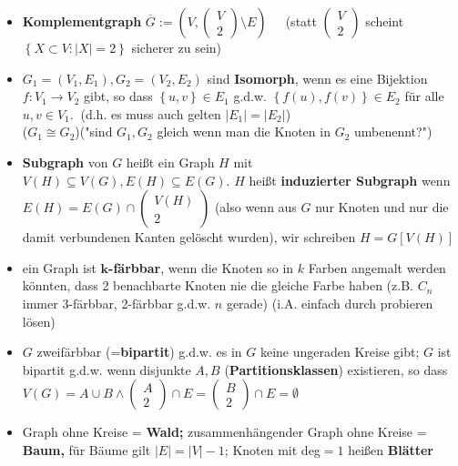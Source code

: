 \documentclass[10pt,a4paper]{article}
\begin{document}
\begin{itemize}
\item \textbf{Komplementgraph} $\overline{G}:=\left(V,\begin{pmatrix}
V\\2
\end{pmatrix}\setminus E \right)\;\;\;\;$  (statt $\begin{pmatrix} V\\2 \end{pmatrix}$ scheint $\left\lbrace X \subset V : \vert X \vert=2\right\rbrace$ sicherer zu sein)
\item $G_{1}=(V_{1},E_{1}), G_{2}=(V_{2},E_{2})$ sind \textbf{Isomorph}, wenn es eine Bijektion $f:V_{1}\rightarrow V_{2}$ gibt, so dass $\left\lbrace u,v\right\rbrace \in E_{1}$ g.d.w. $\left\lbrace f(u),f(v)\right\rbrace \in E_{2}$ für alle $u,v\in V_{1}.\;\;$(d.h. es muss auch gelten $\vert E_{1}\vert=\vert E_{2}\vert$)\\  ($G_{1}\cong G_{2}$)("sind $G_{1},G_{2}$ gleich wenn man die Knoten in $G_{2}$ umbenennt?")
\item \textbf{Subgraph} von $G$ heißt ein Graph $H$ mit $V(H)\subseteq V(G),E(H)\subseteq E(G)$. $H$ heißt \textbf{induzierter Subgraph} wenn $E(H)=E(G)\cap \begin{pmatrix} V(H)\\2\end{pmatrix}$ (also wenn aus $G$ nur Knoten und nur die damit verbundenen Kanten gelöscht wurden), wir schreiben $H=G[V(H)]$
\item ein Graph ist \textbf{$\boldsymbol{k}$-färbbar}, wenn die Knoten so in $k$ Farben angemalt werden könnten, dass 2 benachbarte Knoten nie die gleiche Farbe haben (z.B. $C_{n}$ immer 3-färbbar, 2-färbbar g.d.w. $n$ gerade) (i.A. einfach durch probieren lösen)
\item $G$ zweifärbbar (=\textbf{bipartit}) g.d.w. es in $G$ keine ungeraden Kreise gibt; $G$ ist bipartit g.d.w. wenn disjunkte $A,B$ (\textbf{Partitionsklassen}) existieren, so dass $V(G)=A\cup B\land \begin{pmatrix} A\\2\end{pmatrix}\cap E= \begin{pmatrix} B\\2\end{pmatrix}\cap E =\emptyset$
\item Graph ohne Kreise = \textbf{Wald;} zusammenhängender Graph ohne Kreise = \textbf{Baum,} für Bäume gilt $\vert E \vert =\vert V\vert -1$; Knoten mit deg$=1$ heißen \textbf{Blätter}

\end{itemize}
\end{document}
